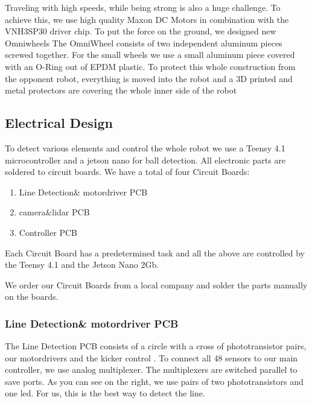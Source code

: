 \documentclass{scrartcl}
\begin{document}
Traveling with high speeds, while being strong is also a huge challenge. To achieve this, we use high quality
Maxon DC Motors in combination with the VNH3SP30 driver chip. To put the force on the ground, we designed
new Omniwheels
The OmniWheel consists of two independent aluminum pieces screwed together. For the small wheels we use a small
aluminum piece covered with an O-Ring out of EPDM plastic.
\newline
To protect this whole construction from the opponent robot, everything is moved into the robot and a 3D
printed and metal protectors are covering the whole inner side of the robot%
\newpage


\subsection{Electrical Design}
To detect various elements and control the whole robot we use a Teensy 4.1 microcontroller and a jetson nano
for ball detection. All electronic parts are soldered to circuit boards.
\newline
We have a total of four Circuit Boards:
\begin{enumerate}
    \item{Line Detection\& motordriver PCB}
    \item{camera\&lidar PCB}
    \item{Controller PCB}
\end{enumerate}
Each Circuit Board has a predetermined task and all the above are controlled by the Teensy 4.1 
and the Jetson Nano 2Gb.

We order our Circuit Boards from a local company and solder the parts manually on the boards.

\subsubsection{Line Detection\& motordriver PCB}


The Line Detection PCB consists of a circle with a cross of phototransistor pairs, our motordrivers and the kicker control . To connect all
48 sensors to our main controller, we use analog multiplexer. The multiplexers are switched parallel
to save ports.
\newline
As you can see on the right, we use pairs of two phototransistors and one led. For us, this is the 
best way to detect the line.
\end{document}
